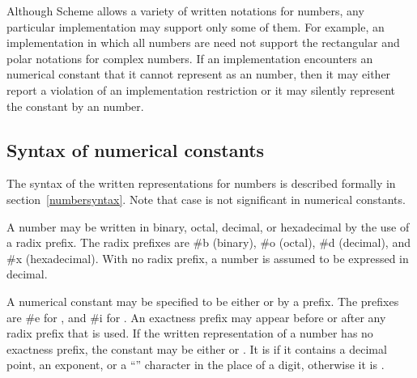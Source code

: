 
Although Scheme allows a variety of written
notations for
numbers, any particular implementation may support only some of them.
For example, an implementation in which all numbers are 
need not support the rectangular and polar notations for complex
numbers.  If an implementation encounters an  numerical constant that
it cannot represent as an  number, then it may either report a
violation of an implementation restriction or it may silently represent the
constant by an  number.


\subsection{Syntax of numerical constants}
\label{numbernotations}


%

The syntax of the written representations for numbers is described formally in
section~\ref{numbersyntax}.  Note that case is not significant in numerical
constants.


A number may be written in binary, octal, decimal, or
hexadecimal by the use of a radix prefix.  The radix prefixes are {\cf
\#b} (binary), {\cf \#o} (octal), {\cf
\#d} (decimal), and {\cf \#x} (hexadecimal).  With
no radix prefix, a number is assumed to be expressed in decimal.

A
numerical constant may be specified to be either  or
 by a prefix.  The prefixes are {\cf \#e}
for , and {\cf \#i} for .  An exactness
prefix may appear before or after any radix prefix that is used.  If
the written representation of a number has no exactness prefix, the
constant may be either  or .  It is
 if it contains a decimal point, an
exponent, or a ``\sharpsign'' character in the place of a digit,
otherwise it is .
%

